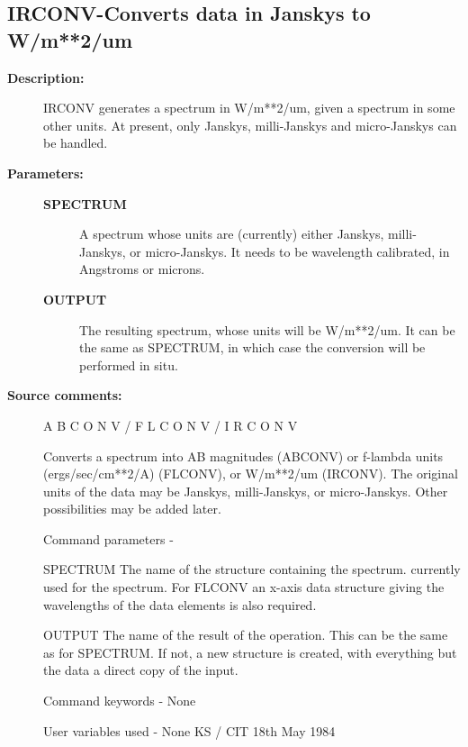 \begin{description}
\subsection{IRCONV-\label{IRCONV}Converts data in Janskys to W/m**2/um}
\begin{description}

\item [\textbf{Description:}]
 IRCONV generates a spectrum in W/m**2/um, given a spectrum
 in some other units.  At present, only Janskys, milli-Janskys and
 micro-Janskys can be handled.

\item [\textbf{Parameters:}]
\begin{description}
\item [\textbf{SPECTRUM}]
 A spectrum whose units are (currently) either Janskys,
 milli-Janskys, or micro-Janskys.  It needs to be
 wavelength calibrated, in Angstroms or microns.
\item [\textbf{OUTPUT}]
 The resulting spectrum, whose units will be
 W/m**2/um. It can be the same as SPECTRUM, in which
 case the conversion will be performed in situ.
\end{description}

\item [\textbf{Source comments:}]
\begin{terminalv}
 A B C O N V  /  F L C O N V  /  I R C O N V

 Converts a spectrum into AB magnitudes (ABCONV) or f-lambda
 units (ergs/sec/cm**2/A) (FLCONV), or W/m**2/um (IRCONV).
 The original units of the
 data may be Janskys, milli-Janskys, or micro-Janskys.  Other
 possibilities may be added later.

 Command parameters -

 SPECTRUM The name of the structure containing the spectrum.
          currently used for the spectrum.  For FLCONV
          an x-axis data structure giving the wavelengths of the
          data elements is also required.

 OUTPUT   The name of the result of the operation.  This can
          be the same as for SPECTRUM. If not, a new structure
          is created, with everything but the data a direct
          copy of the input.

 Command keywords  - None

 User variables used - None
                                  KS / CIT 18th May 1984
\end{terminalv}
\end{description}

\end{description}
